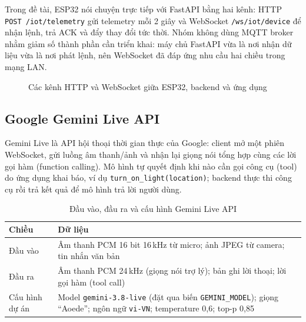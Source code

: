\documentclass[12pt,a4paper]{extarticle}
\newcommand{\hang}{}  %
\begin{document}
Trong đề tài, ESP32 nói chuyện trực tiếp với FastAPI bằng hai kênh: HTTP \texttt{POST /iot/telemetry} gửi telemetry mỗi 2 giây và WebSocket \texttt{/ws/iot/device} để nhận lệnh, trả ACK và đẩy thay đổi tức thời. Nhóm không dùng MQTT broker nhằm giảm số thành phần cần triển khai: máy chủ FastAPI vừa là nơi nhận dữ liệu vừa là nơi phát lệnh, nên WebSocket đã đáp ứng nhu cầu hai chiều trong mạng LAN.

\begin{figure}[H]
\centering
{}
\caption{Các kênh HTTP và WebSocket giữa ESP32, backend và ứng dụng}
\label{fig:kenh}
\end{figure}

\subsection{Google Gemini Live API}
Gemini Live là API hội thoại thời gian thực của Google: client mở một phiên WebSocket, gửi luồng âm thanh/ảnh và nhận lại giọng nói tổng hợp cùng các lời gọi hàm (function calling). Mô hình tự quyết định khi nào cần gọi công cụ (tool) do ứng dụng khai báo, ví dụ \texttt{turn\_on\_light(location)}; backend thực thi công cụ rồi trả kết quả để mô hình trả lời người dùng.

\begin{table}[H]
\centering
\begin{tabularx}{\linewidth}{|p{2.6cm}|L|}
\hline
\hang \textbf{Chiều} & \textbf{Dữ liệu} \\ \hline
Đầu vào & Âm thanh PCM 16 bit 16\,kHz từ micro; ảnh JPEG từ camera; tin nhắn văn bản \\ \hline
Đầu ra & Âm thanh PCM 24\,kHz (giọng nói trợ lý); bản ghi lời thoại; lời gọi hàm (tool call) \\ \hline
Cấu hình dự án & Model \texttt{gemini-3.8-live} (đặt qua biến \texttt{GEMINI\_MODEL}); giọng ``Aoede''; ngôn ngữ \texttt{vi-VN}; temperature 0,6; top-p 0,85 \\ \hline
\end{tabularx}
\caption{Đầu vào, đầu ra và cấu hình Gemini Live API}
\label{tab:gemini}
\end{table}
\end{document}
